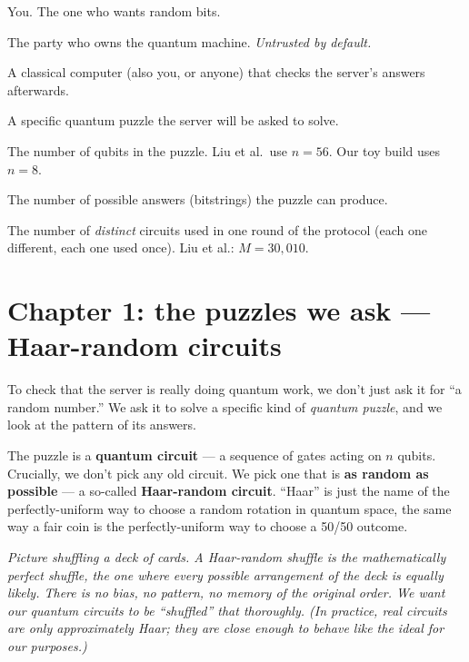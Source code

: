 \documentclass[11pt]{article}
\newenvironment{aside}{\par\medskip\noindent\itshape\small\color{black!70}}{\normalfont\par\medskip}
\begin{document}
\begin{description}[leftmargin=0pt, itemsep=4pt]
\item[The client.] You. The one who wants random bits.
\item[The server.] The party who owns the quantum machine. \emph{Untrusted by default.}
\item[The verifier.] A classical computer (also you, or anyone) that checks the server's answers afterwards.
\item[The challenge circuit.] A specific quantum puzzle the server will be asked to solve.
\item[$n$.] The number of qubits in the puzzle. Liu et al.\ use $n=56$. Our toy build uses $n=8$.
\item[$N=2^n$.] The number of possible answers (bitstrings) the puzzle can produce.
\item[$M$.] The number of \emph{distinct} circuits used in one round of the protocol (each one different, each one used once). Liu et al.: $M=30{,}010$.
\end{description}

\section{Chapter 1: the puzzles we ask --- Haar-random circuits}

To check that the server is really doing quantum work, we don't just ask it for ``a random number.'' We ask it to solve a specific kind of \emph{quantum puzzle}, and we look at the pattern of its answers.

The puzzle is a \textbf{quantum circuit} --- a sequence of gates acting on $n$ qubits. Crucially, we don't pick any old circuit. We pick one that is \textbf{as random as possible} --- a so-called \textbf{Haar-random circuit}. ``Haar'' is just the name of the perfectly-uniform way to choose a random rotation in quantum space, the same way a fair coin is the perfectly-uniform way to choose a 50/50 outcome.

\begin{aside}
Picture shuffling a deck of cards. A \emph{Haar-random} shuffle is the mathematically perfect shuffle, the one where every possible arrangement of the deck is equally likely. There is no bias, no pattern, no memory of the original order. We want our quantum circuits to be ``shuffled'' that thoroughly. (In practice, real circuits are only \emph{approximately} Haar; they are close enough to behave like the ideal for our purposes.)
\end{aside}
\end{document}
